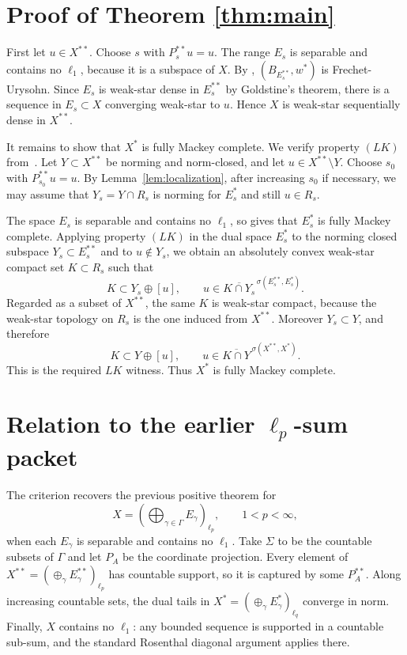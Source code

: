 \documentclass[11pt]{article}
\newcommand{\ol}{\overline}
\newcommand{\Ball}{B}
\begin{document}
\section*{Proof of Theorem \ref{thm:main}}

First let $u\in X^{**}$.  Choose $s$ with $P_s^{**}u=u$.  The range $E_s$ is
separable and contains no $\ell_1$, because it is a subspace of $X$.  By
\cite[Corollary 4.8]{GMR}, $(\Ball_{E_s^{**}},w^*)$ is Frechet-Urysohn.  Since
$E_s$ is weak-star dense in $E_s^{**}$ by Goldstine's theorem, there is a
sequence in $E_s\subset X$ converging weak-star to $u$.  Hence $X$ is
weak-star sequentially dense in $X^{**}$.

It remains to show that $X^*$ is fully Mackey complete.  We verify property
$(LK)$ from~\cite[Theorem 3.5]{GMR}.  Let $Y\subset X^{**}$ be norming and
norm-closed, and let $u\in X^{**}\setminus Y$.  Choose $s_0$ with
$P_{s_0}^{**}u=u$.  By Lemma~\ref{lem:localization}, after increasing $s_0$ if
necessary, we may assume that $Y_s=Y\cap R_s$ is norming for $E_s^*$ and still
$u\in R_s$.

The space $E_s$ is separable and contains no $\ell_1$, so
\cite[Corollary 4.8]{GMR} gives that $E_s^*$ is fully Mackey complete.
Applying property $(LK)$ in the dual space $E_s^*$ to the norming closed
subspace $Y_s\subset E_s^{**}$ and to $u\notin Y_s$, we obtain an absolutely
convex weak-star compact set $K\subset R_s$ such that
\[
K\subset Y_s\oplus [u],
\qquad
u\in \ol{K\cap Y_s}^{\,\sigma(E_s^{**},E_s^*)}.
\]
Regarded as a subset of $X^{**}$, the same $K$ is weak-star compact, because
the weak-star topology on $R_s$ is the one induced from $X^{**}$.  Moreover
$Y_s\subset Y$, and therefore
\[
K\subset Y\oplus [u],
\qquad
u\in \ol{K\cap Y}^{\,\sigma(X^{**},X^*)}.
\]
This is the required $LK$ witness.  Thus $X^*$ is fully Mackey complete.

\section*{Relation to the earlier \texorpdfstring{$\ell_p$}{ell-p}-sum packet}

The criterion recovers the previous positive theorem for
\[
X=\left(\bigoplus_{\gamma\in\Gamma}E_\gamma\right)_{\ell_p},
\qquad 1<p<\infty,
\]
when each $E_\gamma$ is separable and contains no $\ell_1$.  Take $\Sigma$ to
be the countable subsets of $\Gamma$ and let $P_A$ be the coordinate
projection.  Every element of $X^{**}=(\oplus_\gamma E_\gamma^{**})_{\ell_p}$
has countable support, so it is captured by some $P_A^{**}$.  Along increasing
countable sets, the dual tails in
$X^*=(\oplus_\gamma E_\gamma^*)_{\ell_q}$ converge in norm.  Finally, $X$
contains no $\ell_1$: any bounded sequence is supported in a countable sub-sum,
and the standard Rosenthal diagonal argument applies there.
\end{document}
